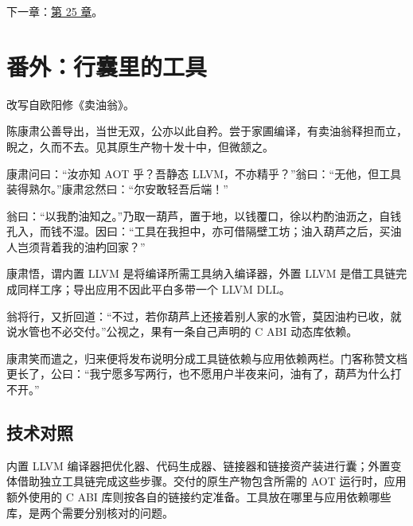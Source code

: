 下一章：\hyperref[ch:25]{第 25 章}。

\section{番外：行囊里的工具}

改写自欧阳修《卖油翁》。

陈康肃公善导出，当世无双，公亦以此自矜。尝于家圃编译，有卖油翁释担而立，睨之，久而不去。见其原生产物十发十中，但微颔之。

康肃问曰：“汝亦知 AOT 乎？吾静态 LLVM，不亦精乎？”翁曰：“无他，但工具装得熟尔。”康肃忿然曰：“尔安敢轻吾后端！”

翁曰：“以我酌油知之。”乃取一葫芦，置于地，以钱覆口，徐以杓酌油沥之，自钱孔入，而钱不湿。因曰：“工具在我担中，亦可借隔壁工坊；油入葫芦之后，买油人岂须背着我的油杓回家？”

康肃悟，谓内置 LLVM 是将编译所需工具纳入编译器，外置 LLVM 是借工具链完成同样工序；导出应用不因此平白多带一个 LLVM DLL。

翁将行，又折回道：“不过，若你葫芦上还接着别人家的水管，莫因油杓已收，就说水管也不必交付。”公视之，果有一条自己声明的 C ABI 动态库依赖。

康肃笑而遣之，归来便将发布说明分成工具链依赖与应用依赖两栏。门客称赞文档更长了，公曰：“我宁愿多写两行，也不愿用户半夜来问，油有了，葫芦为什么打不开。”

\subsection*{技术对照}

内置 LLVM 编译器把优化器、代码生成器、链接器和链接资产装进行囊；外置变体借助独立工具链完成这些步骤。交付的原生产物包含所需的 AOT 运行时，应用额外使用的 C ABI 库则按各自的链接约定准备。工具放在哪里与应用依赖哪些库，是两个需要分别核对的问题。
